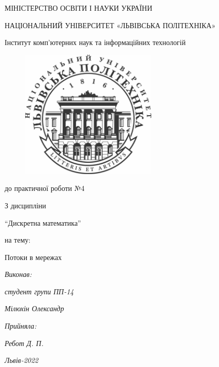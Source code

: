 \begin{titlepage}
\begin{center}

	{\fontsize{14}{24}\selectfont МІНІСТЕРСТВО ОСВІТИ І НАУКИ УКРАЇНИ

	НАЦІОНАЛЬНИЙ УНІВЕРСИТЕТ «ЛЬВІВСЬКА ПОЛІТЕХНІКА»

	Інститут комп'ютерних наук та інформаційних технологій

	}

	\vspace{60.4pt} %
	\begin{figure}[h]
		\centering
		\includegraphics[width=6.5cm,keepaspectratio]{../../../lpnu.png}
	\end{figure}

	{\fontsize{18}{29}\selectfont{Звіт}

	{до практичної роботи №4}

	{З дисципліни}

	{``Дискретна математика''}

	{на тему:}

	{Потоки в мережах}

	}
\end{center}

\vspace{12.1pt} %
	{\fontsize{14}{22.4}\selectfont
\begin{flushright}
	\textit{Виконав:}

	\textit{студент групи ПП-14}

	\textit{Мілюхін Олександр}

	\textit{Прийняла:}

	\textit{Ребот Д. П.}
\end{flushright}
\vspace{37.4pt} %
\begin{center}
\textit{Львів-2022}
\vspace{37.4pt} %
\end{center}
	}

\end{titlepage}

